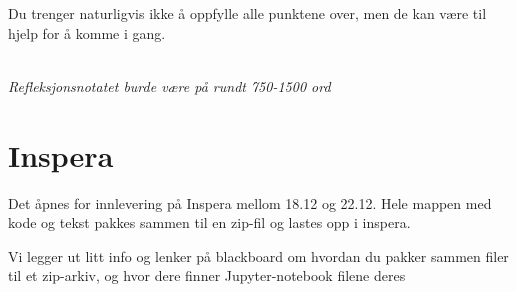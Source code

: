 \documentclass[12pt, titlepage]{article}
\begin{document}
Du trenger naturligvis ikke å oppfylle alle punktene over, men de kan være til hjelp for å komme i gang.

~\\
\textit{Refleksjonsnotatet burde være på rundt 750-1500 ord}

\section*{Inspera}

Det åpnes for innlevering på Inspera mellom 18.12 og 22.12.
Hele mappen med kode og tekst pakkes sammen til en zip-fil og lastes opp i inspera.

Vi legger ut litt info og lenker på blackboard om hvordan du pakker sammen filer til et zip-arkiv, og hvor dere finner Jupyter-notebook filene deres
\end{document}

